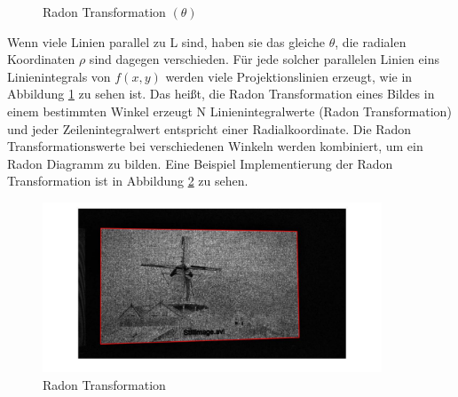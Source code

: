 \begin{figure}[H]
\begin{minipage}[b]{0.49\textwidth}
\caption{Radon Transformation $(\theta)$}
\label{fig:Parallele Linienintegral}
\end{minipage}
\end{figure}

Wenn viele Linien parallel zu L sind, haben sie das gleiche $ \theta $, die radialen Koordinaten $ \rho $ sind dagegen verschieden. Für jede solcher parallelen Linien eins Linienintegrals von $ f(x, y) $ werden viele Projektionslinien erzeugt, wie in Abbildung \ref{fig:Parallele Linienintegral} zu sehen ist. Das heißt, die Radon Transformation eines Bildes in einem bestimmten Winkel erzeugt N Linienintegralwerte (Radon Transformation) und jeder Zeilenintegralwert entspricht einer Radialkoordinate. Die Radon Transformationswerte bei verschiedenen Winkeln werden kombiniert, um ein Radon Diagramm zu bilden. Eine Beispiel Implementierung der Radon Transformation ist in Abbildung \ref{fig:Houghdetektion} zu sehen.

\begin{figure}[H]
 \centering 
  \includegraphics[keepaspectratio,width=0.9\textwidth]{images/4_ZweiteErfahrung/Hough/Houghdetektion.pdf}
 \caption{Radon Transformation}
 \label{fig:Houghdetektion}
\end{figure}

